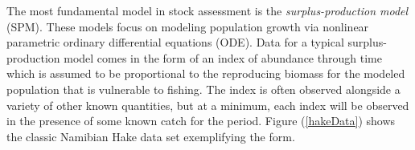 \documentclass[12pt]{ucscthesis}
\begin{document}
 
%
%
%
%
%
%
%
%



The most fundamental model in stock assessment is the {\it surplus-production
model} (SPM). These models focus on modeling population growth via nonlinear
parametric ordinary differential equations (ODE).
Data for a typical surplus-production model comes in the form of an index
of abundance through time which is assumed to be proportional to the reproducing
biomass for the modeled population that is vulnerable to fishing. The index
is often observed alongside a variety of other known quantities, but at a
minimum, each index will be observed in the presence of some known catch for
the period. Figure (\ref{hakeData}) shows the classic Namibian Hake data set
\cite{punt_model_1988, hilborn_ecological_1997, mangel_theoretical_2006}
exemplifying the form.
\end{document}
